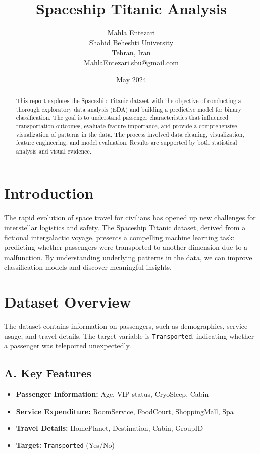 \documentclass[12pt]{article}
\title{Spaceship Titanic Analysis}
\author{Mahla Entezari \\ Shahid Beheshti University \\ Tehran, Iran \\ MahlaEntezari.sbu@gmail.com}
\date{May 2024}
\begin{document}
\maketitle

\begin{abstract}
This report explores the Spaceship Titanic dataset with the objective of conducting a thorough exploratory data analysis (EDA) and building a predictive model for binary classification. The goal is to understand passenger characteristics that influenced transportation outcomes, evaluate feature importance, and provide a comprehensive visualization of patterns in the data. The process involved data cleaning, visualization, feature engineering, and model evaluation. Results are supported by both statistical analysis and visual evidence.
\end{abstract}

\section{Introduction}
The rapid evolution of space travel for civilians has opened up new challenges for interstellar logistics and safety. The Spaceship Titanic dataset, derived from a fictional intergalactic voyage, presents a compelling machine learning task: predicting whether passengers were transported to another dimension due to a malfunction. By understanding underlying patterns in the data, we can improve classification models and discover meaningful insights.

\section{Dataset Overview}
The dataset contains information on passengers, such as demographics, service usage, and travel details. The target variable is \texttt{Transported}, indicating whether a passenger was teleported unexpectedly.

\subsection*{A. Key Features}
\begin{itemize}
    \item \textbf{Passenger Information:} Age, VIP status, CryoSleep, Cabin
    \item \textbf{Service Expenditure:} RoomService, FoodCourt, ShoppingMall, Spa
    \item \textbf{Travel Details:} HomePlanet, Destination, Cabin, GroupID
    \item \textbf{Target:} \texttt{Transported} (Yes/No)
\end{itemize}
\end{document}
